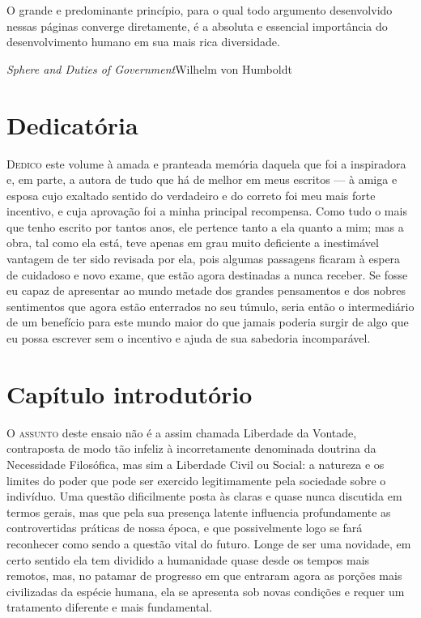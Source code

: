 


\vspace*{.9\textwidth}
\epigraph{O grande e predominante princípio, para o qual todo argumento
desenvolvido nessas páginas converge diretamente, é a absoluta e
essencial importância do desenvolvimento humano em sua mais rica diversidade.}
{\textit{Sphere and Duties of Government}\break Wilhelm von Humboldt} %

\chapter{Dedicatória}


\textsc{Dedico} este volume à amada e pranteada memória daquela que foi a inspiradora e, em
parte, a autora de tudo que há de melhor em meus escritos --- à amiga e
esposa cujo exaltado sentido do verdadeiro e do correto foi meu mais
forte incentivo, e cuja aprovação foi a minha principal recompensa. Como tudo o mais que tenho escrito por tantos
anos, ele pertence tanto a ela quanto a mim; mas a obra, tal como ela
está, teve apenas em grau muito deficiente a inestimável vantagem de
ter sido revisada por ela, pois algumas passagens ficaram à espera de
cuidadoso e novo exame, que estão agora destinadas a
nunca receber. Se fosse eu capaz de apresentar ao mundo metade dos 
grandes pensamentos e dos nobres sentimentos que agora estão
enterrados no seu túmulo, seria então o intermediário de um
benefício para este mundo maior do que jamais poderia surgir de algo que eu
possa escrever sem o incentivo e ajuda de sua sabedoria incomparável. 



\chapter{Capítulo introdutório}

\textsc{O assunto} deste ensaio não é a assim chamada Liberdade da Vontade,
contraposta de modo tão infeliz à incorretamente denominada doutrina
da Necessidade Filosófica, mas sim a Liberdade Civil ou Social: a
natureza e os limites do poder que pode ser exercido legitimamente pela sociedade
sobre o indivíduo. Uma questão dificilmente posta às claras e quase
nunca discutida em termos gerais, mas que pela sua presença latente influencia profundamente as
controvertidas práticas de nossa época, e que
possivelmente logo se fará reconhecer como sendo a questão vital do
futuro. Longe de ser uma novidade, em certo sentido ela tem dividido
a humanidade quase desde os tempos mais remotos, mas, no patamar de
progresso em que entraram agora as porções mais civilizadas da espécie humana,
ela se apresenta sob novas condições e requer um tratamento diferente e
mais fundamental. 

